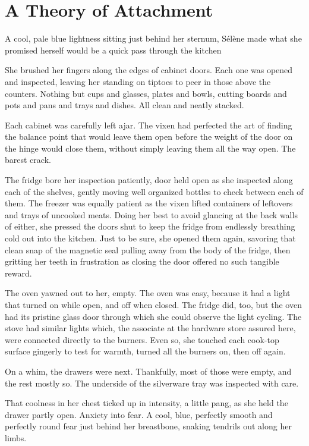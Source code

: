 \chapter{A Theory of Attachment}\label{a-theory-of-attachment}

A cool, pale blue lightness sitting just behind her sternum, Sélène made what she promised herself would be a quick pass through the kitchen

She brushed her fingers along the edges of cabinet doors. Each one was opened and inspected, leaving her standing on tiptoes to peer in those above the counters. Nothing but cups and glasses, plates and bowls, cutting boards and pots and pans and trays and dishes. All clean and neatly stacked.

Each cabinet was carefully left ajar. The vixen had perfected the art of finding the balance point that would leave them open before the weight of the door on the hinge would close them, without simply leaving them all the way open. The barest crack.

The fridge bore her inspection patiently, door held open as she inspected along each of the shelves, gently moving well organized bottles to check between each of them. The freezer was equally patient as the vixen lifted containers of leftovers and trays of uncooked meats. Doing her best to avoid glancing at the back walls of either, she pressed the doors shut to keep the fridge from endlessly breathing cold out into the kitchen. Just to be sure, she opened them again, savoring that clean snap of the magnetic seal pulling away from the body of the fridge, then gritting her teeth in frustration as closing the door offered no such tangible reward.

The oven yawned out to her, empty. The oven was easy, because it had a light that turned on while open, and off when closed. The fridge did, too, but the oven had its pristine glass door through which she could observe the light cycling. The stove had similar lights which, the associate at the hardware store assured here, were connected directly to the burners. Even so, she touched each cook-top surface gingerly to test for warmth, turned all the burners on, then off again.

On a whim, the drawers were next. Thankfully, most of those were empty, and the rest mostly so. The underside of the silverware tray was inspected with care.

That coolness in her chest ticked up in intensity, a little pang, as she held the drawer partly open. Anxiety into fear. A cool, blue, perfectly smooth and perfectly round fear just behind her breastbone, snaking tendrils out along her limbs.

